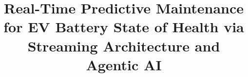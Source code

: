 

% 



































\documentclass[conference]{IEEEtran}
\IEEEoverridecommandlockouts
\usepackage{cite}
\usepackage{amsmath,amssymb,amsfonts}
\usepackage{algorithmic}
\usepackage{graphicx}
\usepackage{textcomp}
\usepackage{xcolor}
\usepackage[hidelinks]{hyperref}



\title{Real-Time Predictive Maintenance for EV Battery State of Health via Streaming Architecture and Agentic AI}

\author{
}

